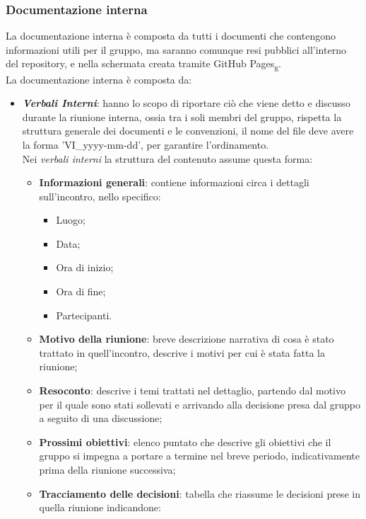 \subsubsection{Documentazione interna}
La documentazione interna è composta da tutti i documenti che contengono
informazioni utili per il gruppo, ma saranno comunque resi pubblici all'interno
del repository, e nella schermata creata tramite GitHub
Pages\textsubscript{g}.\\ La documentazione interna è composta da:
\begin{itemize}
    \item \textit{\textbf{Verbali Interni}}: hanno lo scopo di riportare ciò che viene detto e discusso durante la riunione interna, ossia tra i soli membri del gruppo,
          rispetta la struttura generale dei documenti e le convenzioni, il nome del file deve avere la forma 'VI\_yyyy-mm-dd', per garantire l'ordinamento.
          \\Nei \textit{verbali interni} la struttura del contenuto assume questa forma:
          \begin{itemize}
              \item \textbf{Informazioni generali}: contiene informazioni circa i dettagli sull'incontro, nello specifico:
                    \begin{itemize}
                        \item Luogo;
                        \item Data;
                        \item Ora di inizio;
                        \item Ora di fine;
                        \item Partecipanti.
                    \end{itemize}
              \item \textbf{Motivo della riunione}: breve descrizione narrativa di cosa è stato trattato in quell'incontro, descrive i motivi per cui è stata fatta la riunione;
              \item \textbf{Resoconto}: descrive i temi trattati nel dettaglio, partendo dal motivo per il quale sono stati sollevati e arrivando alla decisione presa dal gruppo a seguito di una discussione;
              \item \textbf{Prossimi obiettivi}: elenco puntato che descrive gli obiettivi che il gruppo si impegna a portare a termine nel breve periodo, indicativamente prima della riunione successiva;
              \item \textbf{Tracciamento delle decisioni}: tabella che riassume le decisioni prese in quella riunione indicandone:

\end{itemize}
\end{itemize}
